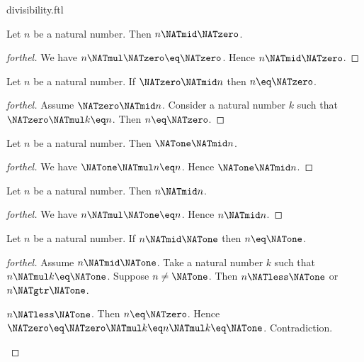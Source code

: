 \documentclass{naproche-library}
\begin{document}
\begin{smodule}[title=Divisibility]{divisibility.ftl}
\begin{proposition}[forthel,id=ARITHMETIC_07_2242720387039232]
  Let $n$ be a natural number.
  Then $n \NATmid \NATzero$.
\end{proposition}
\begin{proof}[forthel]
  We have $n \NATmul \NATzero \eq \NATzero$.
  Hence $n \NATmid \NATzero$.
\end{proof}

\begin{proposition}[forthel,id=ARITHMETIC_07_8611150130315264]
  Let $n$ be a natural number.
  If $\NATzero \NATmid n$ then $n \eq \NATzero$.
\end{proposition}
\begin{proof}[forthel]
  Assume $\NATzero \NATmid n$.
  Consider a natural number $k$ such that $\NATzero \NATmul k \eq n$.
  Then $n \eq \NATzero$.
\end{proof}

\begin{proposition}[forthel,id=ARITHMETIC_07_1259086070939648]
  Let $n$ be a natural number.
  Then $\NATone \NATmid n$.
\end{proposition}
\begin{proof}[forthel]
  We have $\NATone \NATmul n \eq n$.
  Hence $\NATone \NATmid n$.
\end{proof}

\begin{proposition}[forthel,id=ARITHMETIC_07_3944887330275328]
  Let $n$ be a natural number.
  Then $n \NATmid n$.
\end{proposition}
\begin{proof}[forthel]
  We have $n \NATmul \NATone \eq n$.
  Hence $n \NATmid n$.
\end{proof}

\begin{proposition}[forthel,id=ARITHMETIC_07_6917446193643520]
  Let $n$ be a natural number.
  If $n \NATmid \NATone$ then $n \eq \NATone$.
\end{proposition}
\begin{proof}[forthel]
  Assume $n \NATmid \NATone$.
  Take a natural number $k$ such that $n \NATmul k \eq \NATone$.
  Suppose $n \neq \NATone$.
  Then $n \NATless \NATone$ or $n \NATgtr \NATone$.

  \begin{case}{$n \NATless \NATone$.}
    Then $n \eq \NATzero$.
    Hence $\NATzero
      \eq \NATzero \NATmul k
      \eq n \NATmul k
      \eq \NATone$.
    Contradiction.
  \end{case}


\end{proof}
\end{smodule}
\end{document}
